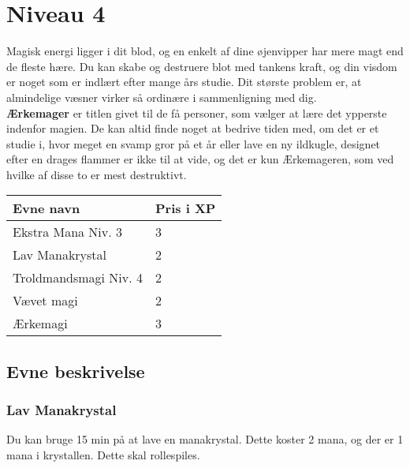 \chapter{Niveau 4}
Magisk energi ligger i dit blod, og en enkelt af dine øjenvipper har mere magt end de fleste hære. Du kan skabe og destruere blot med tankens kraft, og din visdom er noget som er indlært efter mange års studie. Dit største problem er, at almindelige væsner virker så ordinære i sammenligning med dig.\\
\textbf{Ærkemager} er titlen givet til de få personer, som vælger at lære det ypperste indenfor magien. De kan altid finde noget at bedrive tiden med, om det er et studie i, hvor meget en svamp gror på et år eller lave en ny ildkugle, designet efter en drages flammer er ikke til at vide, og det er kun Ærkemageren, som ved hvilke af disse to er mest destruktivt.\\

\begin{table}[H]
    \centering
    \begin{tabular}{|p{}|p{}|}
    \rowcolor{cerulean!80}\hline
        Evne navn & Pris i XP \\\hline
        Ekstra Mana Niv. 3 & 3\\\hline
        Lav Manakrystal & 2\\\hline 
        Troldmandsmagi Niv. 4 & 2\\\hline
        Vævet magi & 2\\\hline
        Ærkemagi & 3\\\hline
    \end{tabular}
\end{table}
\section{Evne beskrivelse}



\subsection{Lav Manakrystal}
Du kan bruge 15 min på at lave en manakrystal. Dette koster 2 mana, og der er 1 mana i krystallen. Dette skal rollespiles. 

